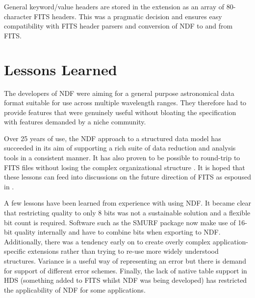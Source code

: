 \documentclass[11pt,twoside]{article}
\begin{document}
General keyword/value headers are stored in the extension as an array of
80-character FITS headers. This was a pragmatic decision and ensures
easy compatibility with FITS header parsers and conversion of NDF to
and from FITS.

\section{Lessons Learned}

The developers of NDF were aiming for a general purpose astronomical
data format suitable for use across multiple wavelength ranges. They
therefore had to provide features that were genuinely useful without
bloating the specification with features demanded by a niche
community.

Over 25 years of use, the NDF approach to a structured data model has
succeeded in its aim of supporting a rich suite of data reduction and
analysis tools in a consistent manner. It has also proven to be
possible to round-trip to FITS files without losing the complex
organizational structure \citep[see e.g.][]{1997STARB..19...14C}. It
is hoped that these lessons can feed into discussions on the future
direction of FITS as espoused in \citet{P90_adassxxiii}.

A few lessons have been learned from experience with using NDF. It
became clear that restricting quality to only 8 bits was not a
sustainable solution and a flexible bit count is required. Software
such as the SMURF package \citep{2013MNRAS.430.2545C} now make use of
16-bit quality internally and have to combine bits when exporting to
NDF. Additionally, there was a tendency early on to create overly
complex application-specific extensions rather than trying to re-use
more widely understood structures. Variance is a useful way of
representing an error but there is demand for support of different
error schemes. Finally, the lack of native table support in HDS
(something added to FITS \citep{1988A&AS...73..365H} whilst NDF was
being developed) has restricted the applicability of NDF for some
applications.


\end{document}
